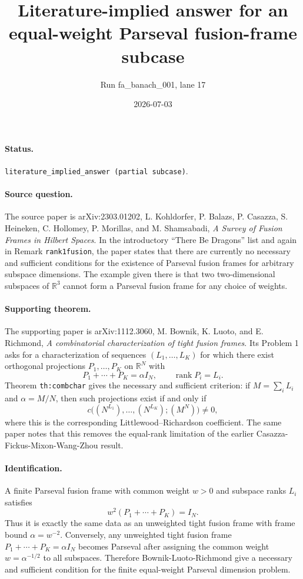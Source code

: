\documentclass[11pt]{article}
\title{Literature-implied answer for an equal-weight Parseval fusion-frame subcase}
\author{Run fa\_banach\_001, lane 17}
\date{2026-07-03}
\begin{document}
\maketitle

\paragraph{Status.}
\texttt{literature\_implied\_answer (partial subcase)}.

\paragraph{Source question.}
The source paper is arXiv:2303.01202, L. Kohldorfer, P. Balazs,
P. Casazza, S. Heineken, C. Hollomey, P. Morillas, and M. Shamsabadi,
\emph{A Survey of Fusion Frames in Hilbert Spaces}. In the introductory
``There Be Dragons'' list and again in Remark \texttt{rank1fusion}, the paper
states that there are currently no necessary and sufficient conditions for the
existence of Parseval fusion frames for arbitrary subspace dimensions. The
example given there is that two two-dimensional subspaces of $\mathbb R^3$
cannot form a Parseval fusion frame for any choice of weights.

\paragraph{Supporting theorem.}
The supporting paper is arXiv:1112.3060, M. Bownik, K. Luoto, and
E. Richmond, \emph{A combinatorial characterization of tight fusion frames}.
Its Problem 1 asks for a characterization of sequences
$(L_1,\ldots,L_K)$ for which there exist orthogonal projections
$P_1,\ldots,P_K$ on $\mathbb R^N$ with
\[
  P_1+\cdots+P_K=\alpha I_N,
  \qquad \operatorname{rank}P_i=L_i.
\]
Theorem \texttt{th:combchar} gives the necessary and sufficient criterion:
if $M=\sum_i L_i$ and $\alpha=M/N$, then such projections exist if and only if
\[
  c\bigl((N^{L_1}),\ldots,(N^{L_K});(M^N)\bigr)\ne 0,
\]
where this is the corresponding Littlewood--Richardson coefficient. The same
paper notes that this removes the equal-rank limitation of the earlier
Casazza-Fickus-Mixon-Wang-Zhou result.

\paragraph{Identification.}
A finite Parseval fusion frame with common weight $w>0$ and subspace ranks
$L_i$ satisfies
\[
  w^2(P_1+\cdots+P_K)=I_N.
\]
Thus it is exactly the same data as an unweighted tight fusion frame with
frame bound $\alpha=w^{-2}$. Conversely, any unweighted tight fusion frame
$P_1+\cdots+P_K=\alpha I_N$ becomes Parseval after assigning the common weight
$w=\alpha^{-1/2}$ to all subspaces. Therefore Bownik-Luoto-Richmond give a
necessary and sufficient condition for the finite equal-weight Parseval
dimension problem.
\end{document}
